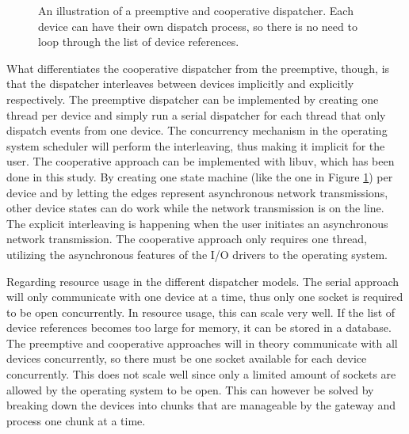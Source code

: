 \begin{figure}[h!]
    \centering

    \caption[An illustration of a preemptive and cooperative dispatcher.]{An
    illustration of a preemptive and cooperative dispatcher. Each device can
    have their own dispatch process, so there is no need to loop through the
    list of device references.}

    \label{fig:dispatcher-pre-coop}
\end{figure}

What differentiates the cooperative dispatcher from the preemptive, though, is
that the dispatcher interleaves between devices implicitly and explicitly
respectively. The preemptive dispatcher can be implemented by creating one
thread per device and simply run a serial dispatcher for each thread that only
dispatch events from one device. The concurrency mechanism in the operating
system scheduler will perform the interleaving, thus making it implicit for the
user. The cooperative approach can be implemented with libuv, which has been
done in this study. By creating one state machine (like the one in Figure
\ref{fig:dispatcher-pre-coop}) per device and by letting the edges represent
asynchronous network transmissions, other device states can do work while the
network transmission is on the line. The explicit interleaving is happening
when the user initiates an asynchronous network transmission. The cooperative
approach only requires one thread, utilizing the asynchronous features of the
I/O drivers to the operating system.

Regarding resource usage in the different dispatcher models. The serial
approach will only communicate with one device at a time, thus only one socket
is required to be open concurrently. In resource usage, this can scale very
well.  If the list of device references becomes too large for memory, it can be
stored in a database. The preemptive and cooperative approaches will in theory
communicate with all devices concurrently, so there must be one socket
available for each device concurrently. This does not scale well since only a
limited amount of sockets are allowed by the operating system to be open. This
can however be solved by breaking down the devices into chunks that are
manageable by the gateway and process one chunk at a time.

